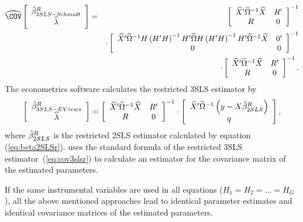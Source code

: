 \begin{eqnarray}
   \COVHat
   \left[ \begin{array}{c}
      \bHat^R_{3SLS-Schmidt} \\ \widehat{\lambda}
   \end{array} \right] 
   & = & 
   \left[ \begin{array}{cc}
      \widehat{X}' \OHat^{-1} \widehat{X} & R' \\
      R & 0
   \end{array} \right]^{-1}
   \\
   & & \cdot
   \left[ \begin{array}{cc}
      \widehat{X}' \OHat^{-1} H \left( H' H \right)^{-1} H' \OHat
      H \left( H' H \right)^{-1} H' \OHat^{-1} \widehat{X} & 0' \\
      0 & 0
   \end{array} \right]^{-1}
   \nonumber \\
   & & \cdot
   \left[ \begin{array}{cc}
      \widehat{X}' \OHat^{-1} \widehat{X} & R' \\
      R & 0
   \end{array} \right]^{-1} .
   \nonumber
\end{eqnarray}
The econometrics software  calculates the restricted 3SLS estimator by
\begin{equation}
   \left[ \begin{array}{c}
      \hat{\beta}^R_{3SLS-EViews} \\ \widehat{\lambda}
   \end{array} \right]
   =
   \left[ \begin{array}{cc}
      \widehat{X}' \widehat{\Omega}^{-1} \widehat{X} & R' \\
      R & 0
   \end{array} \right]^{-1}
   \cdot
   \left[ \begin{array}{c}
      \widehat{X}' \widehat{\Omega}^{-1} \left( y - X \hat{\beta}^R_{2SLS} \right)
      \\ q 
   \end{array} \right] ,
   \label{eq:3slsEViewsR}
\end{equation}
where $\hat{\beta}^R_{2SLS}$ is the restricted 2SLS estimator calculated
by equation (\ref{eq:beta2SLSr}). 
 uses the standard formula of the restricted 3SLS
estimator~(\ref{eq:cov3slsr}) to calculate an estimator
for the covariance matrix of the estimated parameters.


If the same instrumental variables are used in all equations 
($H_1 = H_2 = \ldots = H_G$), 
all the above mentioned approaches lead to identical parameter estimates
and identical covariance matrices of the estimated parameters.

